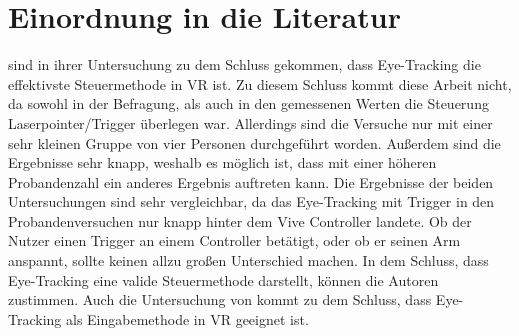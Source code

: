 \section{Einordnung in die Literatur}
\citeauthor{Pai.2019} sind in ihrer Untersuchung zu dem Schluss gekommen, dass Eye-Tracking die effektivste Steuermethode in \ac{VR} ist. Zu diesem Schluss kommt diese Arbeit nicht, da sowohl in der Befragung, als auch in den gemessenen Werten die Steuerung Laserpointer/Trigger überlegen war. Allerdings sind die Versuche nur mit einer sehr kleinen Gruppe von vier Personen durchgeführt worden. Außerdem sind die Ergebnisse sehr knapp, weshalb es möglich ist, dass mit einer höheren Probandenzahl ein anderes Ergebnis auftreten kann. Die Ergebnisse der beiden Untersuchungen sind  sehr vergleichbar, da das Eye-Tracking mit Trigger in den Probandenversuchen nur knapp hinter dem Vive Controller landete. Ob der Nutzer einen Trigger an einem Controller betätigt, oder ob er seinen Arm anspannt, sollte keinen allzu großen Unterschied machen. In dem Schluss, dass Eye-Tracking eine valide Steuermethode darstellt, können die Autoren \citeauthor{Pai.2019} zustimmen. Auch die Untersuchung von \citeauthor{D.Kumar.2016} kommt zu dem Schluss, dass Eye-Tracking als Eingabemethode in \ac{VR} geeignet ist. \cite{D.Kumar.2016} \cite{Pai.2019}




	
